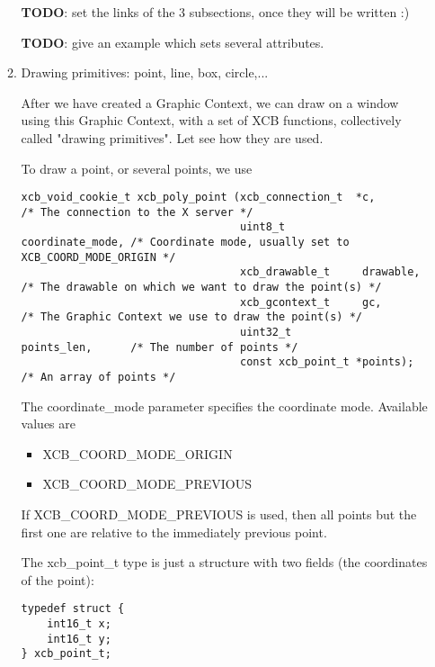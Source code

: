 \documentclass[12pt,oneside,titlepage]{book}
\providecommand{\tightlist}{%
  \setlength{\itemsep}{0pt}\setlength{\parskip}{0pt}}
\begin{document}
\begin{enumerate}
\begin{enumerate}
    \textbf{TODO}: set the links of the 3 subsections, once they will be
    written :)

    \textbf{TODO}: give an example which sets several attributes.
  \item
    \protect\hypertarget{drawingprim}{}{Drawing primitives: point, line,
    box, circle,...}

    After we have created a Graphic Context, we can draw on a window
    using this Graphic Context, with a set of XCB functions,
    collectively called "drawing primitives". Let see how they are used.

    To draw a point, or several points, we use

\begin{verbatim}
xcb_void_cookie_t xcb_poly_point (xcb_connection_t  *c,               /* The connection to the X server */
                                  uint8_t            coordinate_mode, /* Coordinate mode, usually set to XCB_COORD_MODE_ORIGIN */
                                  xcb_drawable_t     drawable,        /* The drawable on which we want to draw the point(s) */
                                  xcb_gcontext_t     gc,              /* The Graphic Context we use to draw the point(s) */
                                  uint32_t           points_len,      /* The number of points */
                                  const xcb_point_t *points);         /* An array of points */
\end{verbatim}

    The {coordinate\_mode} parameter specifies the coordinate mode.
    Available values are

    \begin{itemize}
    \tightlist
    \item
      {XCB\_COORD\_MODE\_ORIGIN}
    \item
      {XCB\_COORD\_MODE\_PREVIOUS}
    \end{itemize}

    If XCB\_COORD\_MODE\_PREVIOUS is used, then all points but the first
    one are relative to the immediately previous point.

    The {xcb\_point\_t} type is just a structure with two fields (the
    coordinates of the point):

\begin{verbatim}
typedef struct {
    int16_t x;
    int16_t y;
} xcb_point_t;
\end{verbatim}


\end{enumerate}
\end{enumerate}
\end{document}
